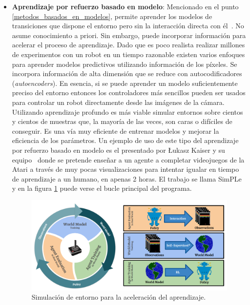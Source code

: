 \begin{itemize}
    \item \textbf{Aprendizaje por refuerzo basado en modelo}: Mencionado en el punto \ref{metodos_basados_en_modelos}, permite aprender los modelos de transiciones que dispone el entorno pero sin la interacción directa con él~\cite{thomas_b_sch}. No asume conocimiento a priori. Sin embargo, puede incorporar información para acelerar el proceso de aprendizaje. Dado que es poco realista realizar millones de experimentos con un robot en un tiempo razonable existen varios enfoques para aprender modelos predictivos utilizando información de los píxeles. Se incorpora información de alta dimensión que se reduce con autocodificadores (\textit{autoencoders}). En esencia, si se puede aprender un modelo suficientemente preciso del entorno entonces los controladores más sencillos pueden ser usados para controlar un robot directamente desde las imágenes de la cámara. Utilizando aprendizaje profundo es más viable simular entornos sobre cientos y cientos de muestras que, la mayoría de las veces, son caras o difíciles de conseguir. Es una vía muy eficiente de entrenar modelos y mejorar la eficiencia de los parámetros. Un ejemplo de uso de este tipo del aprendizaje por refuerzo basado en modelo es el presentado por Łukasz Kaiser y su equipo~\cite{rl_basado_en_modelo} donde se pretende enseñar a un agente a completar videojuegos de la Atari a través de muy pocas visualizaciones para intentar igualar en tiempo de aprendizaje a un humano, en apenas 2 horas. El trabajo se llama SimPLe y en la figura \ref{fig:rl_simple} puede verse el bucle principal del programa.\\
    
    \begin{figure}[!ht]
        \centering \includegraphics[width=0.8\columnwidth]{./figures/chapter_2/SimPLe.png}
        \caption{Simulación de entorno para la aceleración del aprendizaje.}\label{fig:rl_simple}
    \end{figure}
    

\end{itemize}
